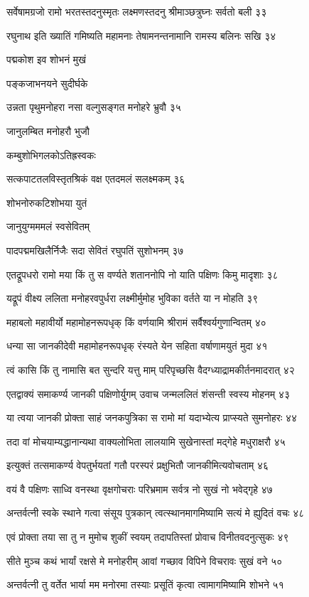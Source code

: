 सर्वेषामग्रजो रामो भरतस्तदनुस्मृतः
लक्ष्मणस्तदनु श्रीमाञ्छत्रुघ्नः सर्वतो बली ३३

रघुनाथ इति ख्यातिं गमिष्यति महामनाः
तेषामनन्तनामानि रामस्य बलिनः सखि ३४

पद्मकोश इव शोभनं मुखं

पङ्कजाभनयने सुदीर्घके

उन्नता पृथुमनोहरा नसा
वल्गुसङ्गत मनोहरे भ्रुवौ ३५

जानुलम्बित मनोहरौ भुजौ

कम्बुशोभिगलकोऽतिह्रस्वकः

सत्कपाटतलविस्तृतश्रिकं
वक्ष एतदमलं सलक्ष्मकम् ३६

शोभनोरुकटिशोभया युतं

जानुयुग्मममलं स्वसेवितम्

पादपद्ममखिलैर्निजैः सदा
सेवितं रघुपतिं सुशोभनम् ३७

एतद्रूपधरो रामो मया किं तु स वर्ण्यते
शताननोपि नो याति पक्षिणः किमु मादृशाः ३८

यद्रूपं वीक्ष्य ललिता मनोहरवपुर्धरा
लक्ष्मीर्मुमोह भुविका वर्तते या न मोहति ३९

महाबलो महावीर्यो महामोहनरूपधृक्
किं वर्णयामि श्रीरामं सर्वैश्वर्यगुणान्वितम् ४०

धन्या सा जानकीदेवी महामोहनरूपधृक्
रंस्यते येन सहिता वर्षाणामयुतं मुदा ४१

त्वं कासि किं तु नामासि बत सुन्दरि यत्तु माम्
परिपृच्छसि वैदग्ध्याद्रामकीर्तनमादरात् ४२

एतद्वाक्यं समाकर्ण्य जानकी पक्षिणोर्युगम्
उवाच जन्मललितं शंसन्ती स्वस्य मोहनम् ४३

या त्वया जानकी प्रोक्ता साहं जनकपुत्रिका
स रामो मां यदाभ्येत्य प्राप्स्यते सुमनोहरः ४४

तदा वां मोचयाम्यद्धानान्यथा वाक्यलोभिता
लालयामि सुखेनास्तां मद्गेहे मधुराक्षरौ ४५

इत्युक्तं तत्समाकर्ण्य वेपतुर्भयतां गतौ
परस्परं प्रक्षुभितौ जानकीमित्यवोचताम् ४६

वयं वै पक्षिणः साध्वि वनस्था वृक्षगोचराः
परिभ्रमाम सर्वत्र नो सुखं नो भवेद्गृहे ४७

अन्तर्वत्नी स्वके स्थाने गत्वा संसूय पुत्रकान्
त्वत्स्थानमागमिष्यामि सत्यं मे ह्युदितं वचः ४८

एवं प्रोक्ता तया सा तु न मुमोच शुकीं स्वयम्
तदापतिस्तां प्रोवाच विनीतवदनुत्सुकः ४९

सीते मुञ्च कथं भार्यां रक्षसे मे मनोहरीम्
आवां गच्छाव विपिने विचरावः सुखं वने ५०

अन्तर्वत्नी तु वर्तेत भार्या मम मनोरमा
तस्याः प्रसूतिं कृत्वा त्वामागमिष्यामि शोभने ५१

